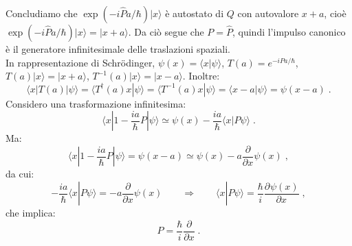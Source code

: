 \documentclass[10pt,a4paper]{report}
\theoremstyle{definition}
\newcommand{\pdev}[3][]{\frac{\partial^{#1} #2}{\partial #3^{#1}}}
\numberwithin{equation}{section}
\newcommand{\bra}{\langle}
\newcommand{\ket}{\rangle}
\newcommand{\Sch}{Schrödinger}
\newcommand{\adj}[1]{#1^{\dagger}}
\begin{document}
Concludiamo che $\exp(-i\hat{P}a/\hbar)|x\ket$ è autostato di $Q$ con autovalore $x+a$, cioè $\exp(-i\hat{P}a/\hbar)|x\ket=|x+a\ket$. Da ciò segue che $P=\hat{P}$, quindi l'impulso canonico è il generatore infinitesimale delle traslazioni spaziali. \\
In rappresentazione di \Sch, $\psi(x)=\bra x|\psi\ket$, $T(a)=e^{-iPa/\hbar}$, $T(a)|x\ket=|x+a\ket$, $T^{-1}(a)|x\ket=|x-a\ket$. Inoltre:
$$
\bra x|T(a)|\psi\ket=\bra \adj{T}(a)x|\psi\ket=\bra T^{-1}(a)x|\psi\ket=\bra x-a|\psi\ket=\psi(x-a)\;.
$$
Considero una trasformazione infinitesima:
\begin{equation}
\bra x|1-\frac{ia}{\hbar}P|\psi\ket\simeq \psi(x)-\frac{ia}{\hbar}\bra x|P\psi\ket\;.
\end{equation}
Ma:
\begin{equation}
\bra x|1-\frac{ia}{\hbar}P|\psi\ket=\psi(x-a)\simeq \psi(x)-a\frac{\partial}{\partial x}\psi(x)\;,
\end{equation}
da cui:
\begin{equation}
-\frac{ia}{\hbar}\bra x|P\psi\ket=-a\frac{\partial}{\partial x}\psi(x) \qquad \Longrightarrow \qquad \bra x|P\psi\ket=\frac{\hbar}{i}\pdev{\psi(x)}{x}\;,
\end{equation}
che implica:
\begin{equation}
P=\frac{\hbar}{i}\frac{\partial}{\partial x}\;.
\end{equation}
\end{document}
